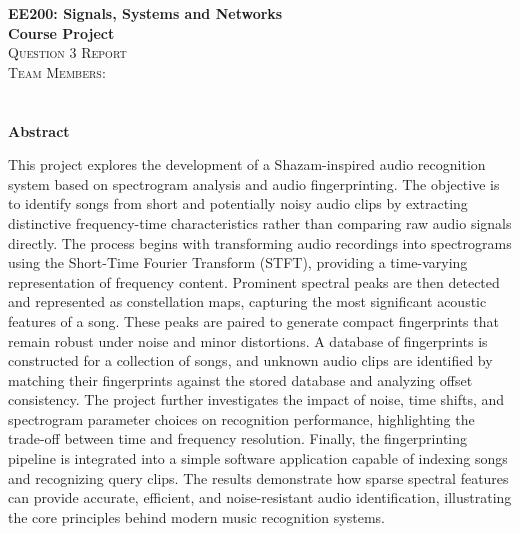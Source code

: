 \documentclass[10pt, a4paper]{article}
\begin{document}
  \begin{center}
    \vspace{2.0cm}
    {\LARGE \textbf{EE200: Signals, Systems and Networks}}\\[4pt]
    {\LARGE \textbf{Course Project}}\\[10pt]
    {\Large \textsc{Question 3 Report}}\\[40pt]







    \Large\textsc{Team Members:}\\[10pt]

    \\
    \\[90pt]

    

    \Large{\textbf{Abstract}}\\[15pt]
    \begin{minipage}{0.90\textwidth}
      \large\itshape\centering
      

        This project explores the development of a Shazam-inspired audio recognition system based on spectrogram analysis and audio fingerprinting. The objective is to identify songs from short and potentially noisy audio clips by extracting distinctive frequency-time characteristics rather than comparing raw audio signals directly. The process begins with transforming audio recordings into spectrograms using the Short-Time Fourier Transform (STFT), providing a time-varying representation of frequency content. Prominent spectral peaks are then detected and represented as constellation maps, capturing the most significant acoustic features of a song. These peaks are paired to generate compact fingerprints that remain robust under noise and minor distortions. A database of fingerprints is constructed for a collection of songs, and unknown audio clips are identified by matching their fingerprints against the stored database and analyzing offset consistency. The project further investigates the impact of noise, time shifts, and spectrogram parameter choices on recognition performance, highlighting the trade-off between time and frequency resolution. Finally, the fingerprinting pipeline is integrated into a simple software application capable of indexing songs and recognizing query clips. The results demonstrate how sparse spectral features can provide accurate, efficient, and noise-resistant audio identification, illustrating the core principles behind modern music recognition systems.
        

    \end{minipage}\\[12pt]
   
    \vspace{0.2cm}
  \end{center}
\end{document}
